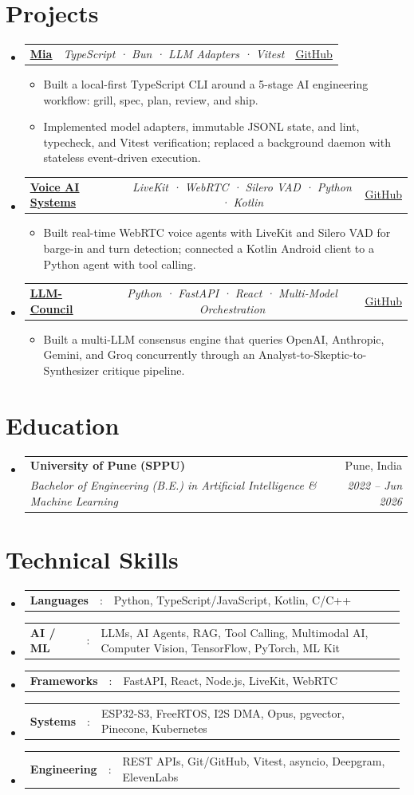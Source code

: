 \documentclass[a4paper,11pt]{article}
\makeatletter
\newcommand{\resumeItem}[1]{\item\small{#1}}
\newcommand{\resumeItemListStart}{\begin{itemize}[rightmargin=0.11in]}
\newcommand{\resumeItemListEnd}{\end{itemize}}
\newcommand{\resumeSectionType}[3]{\item\begin{tabular*}{0.96\textwidth}[t]{p{0.15\linewidth}p{0.02\linewidth}p{0.81\linewidth}}\textbf{#1} & #2 & #3\end{tabular*}\vspace{-1pt}}
\newcommand{\resumeTrioHeading}[3]{\item\small{\begin{tabular*}{0.96\textwidth}[t]{l@{\extracolsep{\fill}}c@{\extracolsep{\fill}}r}\textbf{#1} & \textit{#2} & #3\end{tabular*}\vspace{1pt}}}
\newcommand{\resumeQuadHeading}[4]{\item\begin{tabular*}{0.96\textwidth}[t]{l@{\extracolsep{\fill}}r}\textbf{#1} & #2 \\\textit{\small#3} & \textit{\small #4}\end{tabular*}\vspace{1pt}}
\newcommand{\resumeHeadingListStart}{\begin{itemize}[leftmargin=0.15in,label={},itemsep=2pt,topsep=2pt]}
\newcommand{\resumeHeadingListEnd}{\end{itemize}}
\makeatother
\begin{document}
\section{Projects}
\resumeHeadingListStart{}
\resumeTrioHeading{\href{https://github.com/thesohamdatta/Mia}{\uline{Mia}}}{TypeScript · Bun · LLM Adapters · Vitest}{\href{https://github.com/thesohamdatta/Mia}{\uline{GitHub}}}
\resumeItemListStart{}
\resumeItem{Built a local-first TypeScript CLI around a 5-stage AI engineering workflow: grill, spec, plan, review, and ship.}
\resumeItem{Implemented model adapters, immutable JSONL state, and lint, typecheck, and Vitest verification; replaced a background daemon with stateless event-driven execution.}
\resumeItemListEnd{}
\resumeTrioHeading{\href{https://github.com/thesohamdatta/John}{\uline{Voice AI Systems}}}{LiveKit · WebRTC · Silero VAD · Python · Kotlin}{\href{https://github.com/thesohamdatta/John}{\uline{GitHub}}}
\resumeItemListStart{}
\resumeItem{Built real-time WebRTC voice agents with LiveKit and Silero VAD for barge-in and turn detection; connected a Kotlin Android client to a Python agent with tool calling.}
\resumeItemListEnd{}
\resumeTrioHeading{\href{https://github.com/thesohamdatta/LLM-Council}{\uline{LLM-Council}}}{Python · FastAPI · React · Multi-Model Orchestration}{\href{https://github.com/thesohamdatta/LLM-Council}{\uline{GitHub}}}
\resumeItemListStart{}
\resumeItem{Built a multi-LLM consensus engine that queries OpenAI, Anthropic, Gemini, and Groq concurrently through an Analyst-to-Skeptic-to-Synthesizer critique pipeline.}
\resumeItemListEnd{}
\resumeHeadingListEnd{}
\section{Education}
\resumeHeadingListStart{}
\resumeQuadHeading{University of Pune (SPPU)}{Pune, India}{Bachelor of Engineering (B.E.) in Artificial Intelligence \& Machine Learning}{2022 -- Jun 2026}
\resumeHeadingListEnd{}
\section{Technical Skills}
\resumeHeadingListStart{}
\resumeSectionType{Languages}{:}{Python, TypeScript/JavaScript, Kotlin, C/C++}
\resumeSectionType{AI / ML}{:}{LLMs, AI Agents, RAG, Tool Calling, Multimodal AI, Computer Vision, TensorFlow, PyTorch, ML Kit}
\resumeSectionType{Frameworks}{:}{FastAPI, React, Node.js, LiveKit, WebRTC}
\resumeSectionType{Systems}{:}{ESP32-S3, FreeRTOS, I2S DMA, Opus, pgvector, Pinecone, Kubernetes}
\resumeSectionType{Engineering}{:}{REST APIs, Git/GitHub, Vitest, asyncio, Deepgram, ElevenLabs}
\resumeHeadingListEnd{}
\end{document}
